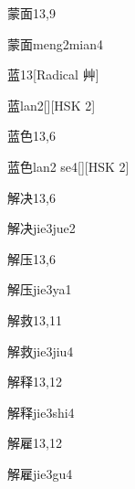 \begin{entry}{蒙面}{13,9}
  \begin{phonetics}{蒙面}{meng2mian4}
  \end{phonetics}
\end{entry}

\begin{entry}{蓝}{13}[Radical 艸]
  \begin{phonetics}{蓝}{lan2}[][HSK 2]
  \end{phonetics}
\end{entry}

\begin{entry}{蓝色}{13,6}
  \begin{phonetics}{蓝色}{lan2 se4}[][HSK 2]
  \end{phonetics}
\end{entry}

\begin{entry}{解决}{13,6}
  \begin{phonetics}{解决}{jie3jue2}
  \end{phonetics}
\end{entry}

\begin{entry}{解压}{13,6}
  \begin{phonetics}{解压}{jie3ya1}
  \end{phonetics}
\end{entry}

\begin{entry}{解救}{13,11}
  \begin{phonetics}{解救}{jie3jiu4}
  \end{phonetics}
\end{entry}

\begin{entry}{解释}{13,12}
  \begin{phonetics}{解释}{jie3shi4}
  \end{phonetics}
\end{entry}

\begin{entry}{解雇}{13,12}
  \begin{phonetics}{解雇}{jie3gu4}
  \end{phonetics}
\end{entry}

